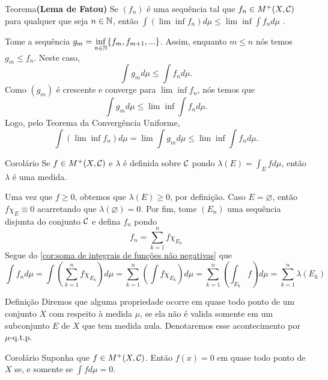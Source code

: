 \begin{env}{Teorema}\textbf{(Lema de Fatou)}
	\label{teo:lema de fatou}
	Se $(f_n)$ é uma sequência tal que $f_n \in M^+(X, \operatorname{\mathcal{C}})$ para qualquer que seja $n \in \operatorname{\mathbb{N}}$, então 
	$\displaystyle
	\int(\lim \inf f_n)d\mu \leq \lim \inf \int f_n d\mu$ \cite{bartle}. 
\end{env}
\begin{prova}
	Tome a sequência $g_m = \displaystyle \inf_{n \in \operatorname{\mathbb{N}}}\{f_m, f_{m+1},...\}$.
	Assim, enquanto $m\leq n$ nós temos $g_m \leq f_n$.
	Neste caso,
	$$
	\int g_m d\mu \leq \int f_n d\mu.
	$$
	Como $(g_m)$ é crescente e converge para $\lim\inf f_n$, nós temos que 
	$$
	\int g_m d\mu \leq \lim \inf \int f_n d\mu.
	$$
	Logo, pelo Teorema da Convergência Uniforme,
	$$
	\int (\lim \inf f_n)d\mu = \lim \int g_m d\mu \leq \lim \inf \int f_n d\mu.
	$$ 
\end{prova}
  
\begin{env}{Corolário}
	Se $f \in M^+(X, \operatorname{\mathcal{C}})$ e $\lambda$ é definida sobre $\operatorname{\mathcal{C}}$ pondo
	$
	\displaystyle\lambda(E) = \int_E fd\mu 
	$,
	então $\lambda$ é uma medida.
\end{env}

\begin{prova}
	Uma vez que $f \geq 0$, obtemos que $\lambda(E) \geq 0$, por definição.
	Caso $E = \varnothing$, então $f\chi_E \equiv 0$ acarretando que $\lambda(\varnothing) = 0$.
	Por fim, tome $(E_n)$ uma sequência disjunta do conjunto $\operatorname{\mathcal{C}}$ e defina
	$f_n$ pondo
	$$
	f_n = \sum_{k =1}^nf\chi_{E_k}
	$$
	Segue do \ref{cor:soma de integrais de funções não negativas} que
	$$
	\int f_n d\mu
	= \int \left(\sum_{k =1}^nf\chi_{E_k}\right) d\mu
	= \sum_{k =1}^n \left(\int f\chi_{E_k}\right) d\mu
	= \sum_{k =1}^n \left(\int_{E_k} f\right) d\mu
	= \sum_{k =1}^n \lambda(E_k)
	$$
\end{prova}


\begin{env}{Definição}
	\label{def:quase-todo-ponto}
	Diremos que alguma propriedade ocorre em quase todo ponto de um conjunto $X$ com respeito à medida $\mu$, se ela não é valida somente em um subconjunto $E$ de $X$ que tem medida nula.
	Denotaremos esse acontecimento por $\mu$-q.t.p.
\end{env}

\begin{env}{Corolário}
	Suponha que $f \in M^+(X, \operatorname{\mathcal{C}})$. Então
	$f(x) = 0$ em quase todo ponto de $X$ se, e somente se $\displaystyle \int fd\mu = 0$.
\end{env}

